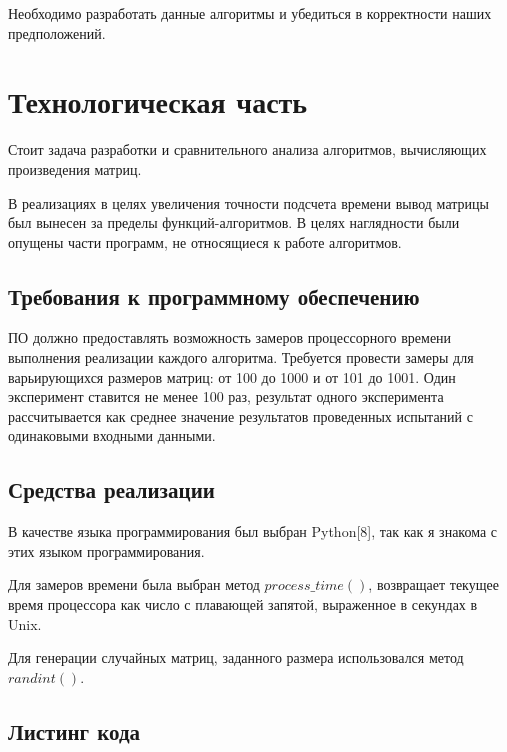 \documentclass[a4paper,14pt]{article} %
\begin{document}
	Необходимо разработать данные алгоритмы и убедиться в корректности наших предположений. 
	
    	\newpage

        \section{Технологическая часть}
        \hfill
        
        Стоит задача разработки и сравнительного анализа алгоритмов, вычисляющих произведения матриц. 
        \hfill
        
        В реализациях в целях увеличения точности подсчета времени вывод матрицы был вынесен за пределы функций-алгоритмов. В целях наглядности были опущены части программ, не относящиеся к работе алгоритмов.
        
        \hfill

        \subsection{Требования к программному обеспечению}
        \hfill
        
        ПО должно предоставлять возможность замеров процессорного времени выполнения реализации каждого алгоритма. Требуется провести замеры для варьирующихся размеров матриц: от 100 до 1000 и от 101 до 1001. Один эксперимент ставится не менее 100 раз, результат одного эксперимента рассчитывается как среднее значение результатов проведенных испытаний с одинаковыми входными данными.
        \hfill
        
        \subsection{Средства реализации}
        \hfill
        
        В качестве языка программирования был выбран Python[8], так как я знакома с этих языком программирования. 
        \hfill
        
        Для замеров времени была выбран метод $process\_time()$, возвращает текущее время процессора как число с плавающей запятой, выраженное в секундах в Unix.
        \hfill
        
        Для генерации случайных матриц, заданного размера использовался метод $randint()$. 
        \hfill
        
        \subsection{Листинг кода}
        \hfill
        
\end{document}
